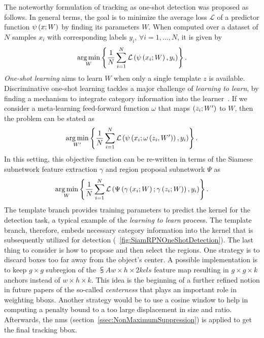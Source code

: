 The noteworthy formulation of tracking as one-shot detection was proposed as follows. In general terms, the goal is to minimize the average loss $\mathcal{L}$ of a predictor function ${\psi} \left( x; W \right)$ by finding its parameters $W$. When computed over a dataset of $N$ samples $x_i$ with corresponding labels $y_i$, $\forall i = 1, \dots, N$, it is given by
\begin{equation}
    \label{eq:SiamRPNOneShotGeneral}
    \underset{W}{\operatorname*{arg\,min}}
    \left\{ {
        \frac{1}{N}
        \sum_{i = 1}^{N}
        {\mathcal{L}} \left( 
            {\psi} \left( x_i; W \right),
            y_i
         \right)
    } \right\}.
\end{equation}
\emph{One-shot learning} aims to learn $W$ when only a single template $z$ is available.
Discriminative one-shot learning tackles a major challenge of \emph{learning to learn}, by finding a mechanism to integrate category information into the learner~\cite{bertinetto2016oneshot}. If we consider a meta-learning feed-forward function $\omega$ that maps $\left( {z_i; W'} \right)$ to $W$, then the problem can be stated as
\begin{equation}
    \label{eq:SiamRPNOneShotMetaLearning}
    \underset{W'}{\operatorname*{arg\,min}}
    \left\{ {
        \frac{1}{N}
        \sum_{i = 1}^{N}
        {\mathcal{L}} \left( 
            {\psi} \left( x_i; {\omega} \left( z_i, W' \right) \right),
            y_i
         \right)
    } \right\}.
\end{equation}
In this setting, this objective function can be re-written in terms of the Siamese subnetwork feature extraction $\gamma$ and region proposal subnetwork $\Psi$ as
\begin{equation}
    \label{eq:SiamRPNOneShoCombo}
    \underset{W}{\operatorname*{arg\,min}}
    \left\{ {
        \frac{1}{N}
        \sum_{i = 1}^{N}
        {\mathcal{L}} \left( 
            {\Psi} \left( {\gamma} \left( x_i; W \right); {\gamma} \left( z_i; W \right) \right),
            y_i
         \right)
    } \right\}.
\end{equation}
The template branch provides training parameters to predict the kernel for the detection task, a typical example of the \emph{learning to learn} process. The template branch, therefore, embeds necessary category information into the kernel that is subsequently utilized for detection (\figstr{}~\ref{fig:SiamRPNOneShotDetection}). The last thing to consider is how to propose and then select the regions. One strategy is to discard boxes too far away from the object's center. A possible implementation is to keep $g \times g$ subregion of the $\subsup{A}{w \times h \times 2k}{cls}$ feature map resulting in $g \times g \times k$ anchors instead of $w \times h \times k$. This idea is the beginning of a further refined notion in future papers of the so-called \emph{centerness} that plays an important role in weighting \glspl{bbox}. Another strategy would be to use a cosine window to help in computing a penalty bound to a too large displacement in size and ratio. Afterwards, the \gls{nms} (section~\ref{ssec:NonMaximumSuppression}) is applied to get the final tracking \gls{bbox}.

